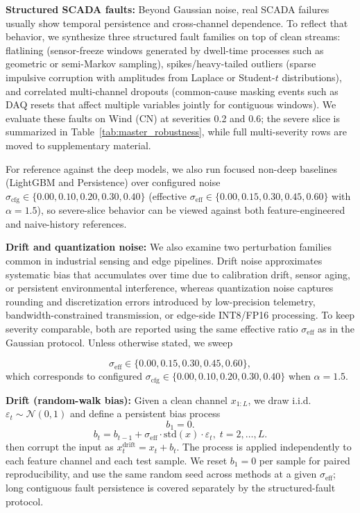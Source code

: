 \documentclass[review,1p,times]{elsarticle}
\begin{document}
\noindent\textbf{Structured SCADA faults:}
\label{subsubsec:robust_structured}
Beyond Gaussian noise, real SCADA failures usually show temporal persistence and cross-channel dependence. To reflect that behavior, we synthesize three structured fault families on top of clean streams: flatlining (sensor-freeze windows generated by dwell-time processes such as geometric or semi-Markov sampling), spikes/heavy-tailed outliers (sparse impulsive corruption with amplitudes from Laplace or Student-$t$ distributions), and correlated multi-channel dropouts (common-cause masking events such as DAQ resets that affect multiple variables jointly for contiguous windows). We evaluate these faults on Wind (CN) at severities 0.2 and 0.6; the severe slice is summarized in Table~\ref{tab:master_robustness}, while full multi-severity rows are moved to supplementary material.

For reference against the deep models, we also run focused non-deep baselines (LightGBM and Persistence) over configured noise $\sigma_{\mathrm{cfg}}\in\{0.00,0.10,0.20,0.30,0.40\}$ (effective $\sigma_{\mathrm{eff}}\in\{0.00,0.15,0.30,0.45,0.60\}$ with $\alpha=1.5$), so severe-slice behavior can be viewed against both feature-engineered and naive-history references.

\noindent\textbf{Drift and quantization noise:}
We also examine two perturbation families common in industrial sensing and edge pipelines. Drift noise approximates systematic bias that accumulates over time due to calibration drift, sensor aging, or persistent environmental interference, whereas quantization noise captures rounding and discretization errors introduced by low-precision telemetry, bandwidth-constrained transmission, or edge-side INT8/FP16 processing. To keep severity comparable, both are reported using the same effective ratio $\sigma_{\mathrm{eff}}$ as in the Gaussian protocol. Unless otherwise stated, we sweep

\begin{equation}
\sigma_{\mathrm{eff}} \in \{0.00, 0.15, 0.30, 0.45, 0.60\},
\end{equation}
which corresponds to configured $\sigma_{\mathrm{cfg}}\in\{0.00,0.10,0.20,0.30,0.40\}$ when $\alpha=1.5$.

\noindent\textbf{Drift (random-walk bias):}
Given a clean channel $x_{1:L}$, we draw i.i.d.\ $\varepsilon_t\sim\mathcal{N}(0,1)$ and define a persistent bias process
\begin{equation}
b_1 = 0.
\end{equation}
\begin{equation}
b_t = b_{t-1} + \sigma_{\mathrm{eff}}\cdot \mathrm{std}(x)\cdot \varepsilon_t,\; t=2,\dots,L.
\end{equation}
then corrupt the input as $x^{\text{drift}}_t = x_t + b_t$. The process is applied independently to each feature channel and each test sample. We reset $b_1=0$ per sample for paired reproducibility, and use the same random seed across methods at a given $\sigma_{\mathrm{eff}}$; long contiguous fault persistence is covered separately by the structured-fault protocol.
\end{document}
